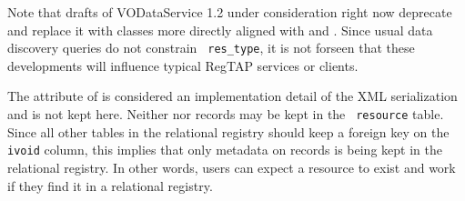\documentclass[11pt,a4paper]{ivoa}
\newcommand{\rtent}[1]{\texttt{\color{rtcolor} #1}}
\begin{document}
Note that drafts of VODataService 1.2 under consideration right now
deprecate  and replace it with classes more
directly aligned with  and
.  Since usual data discovery queries do not
constrain \rtent{res\_type}, it is not forseen that these developments
will influence typical RegTAP services or clients.

The  attribute of  is
considered an implementation detail of the XML serialization and is not
kept here.  Neither  nor 
records may be kept in the \rtent{resource} table.  Since all
other tables in the relational registry should keep a foreign key on the
\rtent{ivoid} column, this implies that only metadata on
 records 
is being kept in the relational registry. In other words, users can
expect a resource to exist and work if they find it in a relational 
registry.


\end{document}
